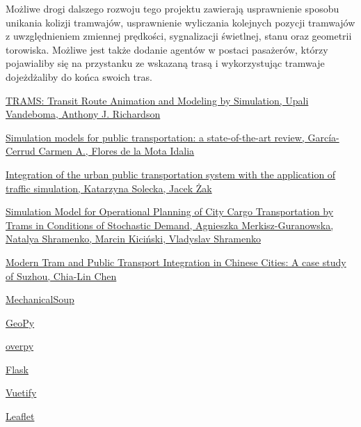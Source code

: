 \documentclass[12pt,a4paper]{article}
\begin{document}
        Możliwe drogi dalszego rozwoju tego projektu zawierają usprawnienie sposobu unikania kolizji tramwajów, usprawnienie wyliczania kolejnych pozycji tramwajów z uwzględnieniem zmiennej prędkości, sygnalizacji świetlnej, stanu oraz geometrii torowiska. Możliwe jest także dodanie agentów w postaci pasażerów, którzy pojawialiby się na przystanku ze wskazaną trasą i wykorzystując tramwaje dojeżdżaliby do końca swoich tras.

    \newpage

    \begin{thebibliography}{99}
        \href{https://onlinelibrary.wiley.com/doi/epdf/10.1002/atr.5670190205}{TRAMS: Transit Route Animation and Modeling by Simulation, Upali Vandeboma, Anthony J. Richardson}

        \href{https://www.sciencedirect.com/science/article/pii/S1877050922023304?ref=cra_js_challenge&fr=RR-1}{Simulation models for public transportation: a state-of-the-art review, García-Cerrud Carmen A., Flores de la Mota Idalia}

        \href{https://www.sciencedirect.com/science/article/pii/S2352146514001689}{Integration of the urban public transportation system with the application of traffic simulation, Katarzyna Solecka, Jacek Żak}

        \href{https://www.mdpi.com/1996-1073/16/10/4076}{Simulation Model for Operational Planning of City Cargo Transportation by Trams in Conditions of Stochastic Demand, Agnieszka Merkisz-Guranowska, Natalya Shramenko, Marcin Kiciński, Vladyslav Shramenko}

        \href{https://www.itf-oecd.org/sites/default/files/docs/public-transport-integration-chinese-cities.pdf}{Modern Tram and Public Transport Integration in Chinese Cities: A case study of Suzhou, Chia-Lin Chen}

        \href{https://mechanicalsoup.readthedocs.io/en/stable/}{MechanicalSoup}

        \href{https://geopy.readthedocs.io/en/stable/}{GeoPy}

        \href{https://pypi.org/project/overpy/}{overpy}

        \href{https://flask.palletsprojects.com/en/3.0.x/}{Flask}

        \href{https://vuetifyjs.com/en/}{Vuetify}

        \href{https://leafletjs.com}{Leaflet}
    \end{thebibliography}
\end{document}
